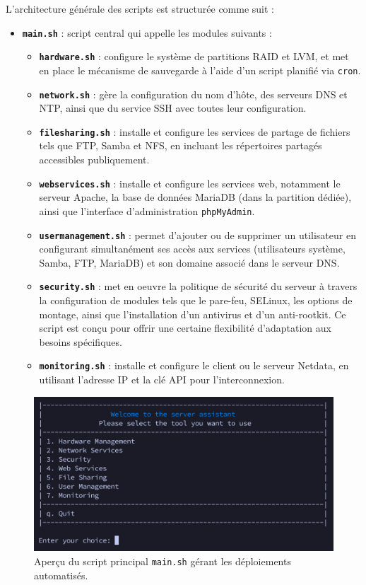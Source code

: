 \documentclass[a4paper,12pt]{article}
\begin{document}
L'architecture générale des scripts est structurée comme suit :

\begin{itemize}
    \item \textbf{\texttt{main.sh}} : script central qui appelle les modules suivants :
    \begin{itemize}
        \item \textbf{\texttt{hardware.sh}} : configure le système de partitions RAID et LVM, et met en place le mécanisme de sauvegarde à l'aide d'un script planifié via \texttt{cron}.
        \item \textbf{\texttt{network.sh}} : gère la configuration du nom d'hôte, des serveurs DNS et NTP, ainsi que du service SSH avec toutes leur configuration.
        
        \item \textbf{\texttt{filesharing.sh}} : installe et configure les services de partage de fichiers tels que FTP, Samba et NFS, en incluant les répertoires partagés accessibles publiquement.
        \item \textbf{\texttt{webservices.sh}} : installe et configure les services web, notamment le serveur Apache, la base de données MariaDB (dans la partition dédiée), ainsi que l'interface d'administration \texttt{phpMyAdmin}.
        \item \textbf{\texttt{usermanagement.sh}} : permet d'ajouter ou de supprimer un utilisateur en configurant simultanément ses accès aux services (utilisateurs système, Samba, FTP, MariaDB) et son domaine associé dans le serveur DNS.
        \item \textbf{\texttt{security.sh}} : met en oeuvre la politique de sécurité du serveur à travers la configuration de modules tels que le pare-feu, SELinux, les options de montage, ainsi que l'installation d'un antivirus et d'un anti-rootkit. Ce script est conçu pour offrir une certaine flexibilité d'adaptation aux besoins spécifiques.
        \item \textbf{\texttt{monitoring.sh}} : installe et configure le client ou le serveur Netdata, en utilisant l'adresse IP et la clé API pour l'interconnexion.
    \end{itemize}
\end{itemize}


\begin{figure}[H]
    \centering
    \includegraphics[width=\textwidth]{main.png}
    \caption{Aperçu du script principal \texttt{main.sh} gérant les déploiements automatisés.}
    \label{fig:script-main}
\end{figure}
\end{document}
